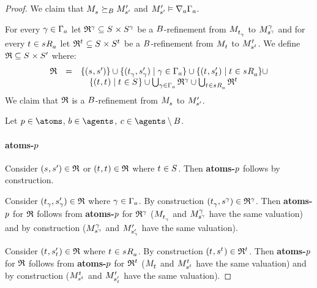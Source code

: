\begin{proof}

We claim that $\kPModel{\kStateS} \simulatesBs \kPModelP{\kStateSP}$ and $\kPModelP{\kStateSP} \entails \coversA \Gamma_\agentA$.

For every $\gamma \in \Gamma_\agentA$ let $\refinement^\gamma \subseteq \kStates \times \kStates[\gamma]$ be a $\agentsB$-refinement from $\kPModel{\kStateT_\gamma}$ to $\kPModel[\gamma]{\kStateS[\gamma]}$ and
for every $\kStateT \in \kSuccessorsA{\kStateS}$ let $\refinement^{\kStateT} \subseteq \kStates \times \kStates[\kStateT]$ be a $\agentsB$-refinement from $\kPModel{\kStateT}$ to $\kPModel[\kStateT]{\kStateS[\kStateT]}$.
We define $\refinement \subseteq \kStates \times \kStatesP$ where:
$$
\begin{array}{rcl}
    \refinement &=& \{(\kStateS, \kStateSP)\} \cup \{(\kStateT_\gamma, \kStateSP_\gamma) \mid \gamma \in \Gamma_\agentA\} \cup \{(\kStateT, \kStateSP_{\kStateT}) \mid \kStateT \in \kSuccessorsA{\kStateS}\} \cup \\&&\quad \{(\kStateT, \kStateT) \mid \kStateT \in \kStates\} \cup \bigcup_{\gamma \in \Gamma_\agentA} \refinement^\gamma \cup \bigcup_{\kStateT \in \kSuccessorsA{\kStateS}} \refinement^{\kStateT}
\end{array}
$$
We claim that $\refinement$ is a $\agentsB$-refinement from $\kPModel{\kStateS}$ to $\kPModelP{\kStateSP}$.

Let $\atomP \in \atoms$, $\agentB \in \agents$, $\agentC \in \agents \setminus \agentsB$.

\paragraph{atoms-$\atomP$}
Consider $(\kStateS, \kStateSP) \in \refinement$ or $(\kStateT, \kStateT) \in \refinement$ where $\kStateT \in \kStates$.
Then {\bf atoms-$\atomP$} follows by construction.

Consider $(\kStateT_\gamma, \kStateSP_\gamma) \in \refinement$ where $\gamma \in \Gamma_\agentA$.
By construction $(\kStateT_\gamma, \kStateS[\gamma]) \in \refinement^\gamma$.
Then {\bf atoms-$\atomP$} for $\refinement$ follows from {\bf atoms-$\atomP$} for $\refinement^\gamma$ ($\kPModel{\kStateT_\gamma}$ and $\kPModel[\gamma]{\kStateS[\gamma]}$ have the same valuation) and by construction ($\kPModel[\gamma]{\kStateS[\gamma]}$ and $\kPModelP{\kStateSP_\gamma}$ have the same valuation).

Consider $(\kStateT, \kStateSP_{\kStateT}) \in \refinement$ where $\kStateT \in \kSuccessorsA{\kStateS}$.
By construction $(\kStateT, \kStateS[\kStateT]) \in \refinement^{\kStateT}$.
Then {\bf atoms-$\atomP$} for $\refinement$ follows from {\bf atoms-$\atomP$} for $\refinement^{\kStateT}$ ($\kPModel{\kStateT}$ and $\kPModel[\kStateT]{\kStateS[\kStateT]}$ have the same valuation) and by construction ($\kPModel[\kStateT]{\kStateS[\kStateT]}$ and $\kPModelP{\kStateSP_{\kStateT}}$ have the same valuation).


\end{proof}

